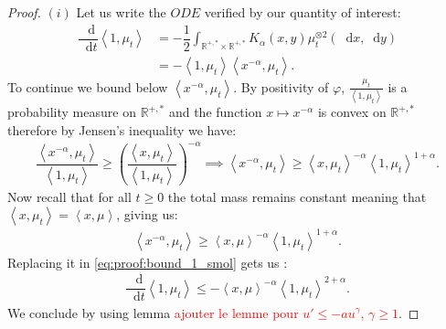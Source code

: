 \documentclass[11pt,a4paper]{article}
\newcommand{\RR}{\mathbb{R}}
\newcommand{\red}[1]{\textcolor{red}{#1}}
\newcommand{\dd}{\mathop{}\!\mathrm{d}}
\begin{document}
\begin{proof}
    $(i)$ Let us write the $ODE$ verified by our quantity of interest:
    \begin{align}
        \dfrac{\dd}{\dd t} \left\langle 1, \mu_t \right\rangle
        &= -\dfrac12\int_{\RR^{+,*} \times \RR^{+,*} } K_\alpha(x,y) \mu_t^{\otimes 2} (\dd x, \dd y) \nonumber\\
        &= -\left\langle 1, \mu_t \right\rangle \left\langle x^{-\alpha}, \mu_t \right\rangle. \label{eq:proof:bound_1_smol}
    \end{align}
    To continue we bound below $\left\langle x^{-\alpha}, \mu_t \right\rangle$. By positivity of $\varphi$, $\frac{\mu_t}{\left\langle 1, \mu_t\right\rangle}$ is a probability measure on $\RR^{+,*}$ and the function $x\mapsto x^{-\alpha}$ is convex on $\RR^{+,*}$ therefore by Jensen's inequality we have:
    \begin{align*}
        \dfrac{\left\langle x^{-\alpha},\mu_t \right\rangle}{\left\langle 1, \mu_t\right\rangle} \geq  \left(\dfrac{\left\langle x,\mu_t \right\rangle}{\left\langle 1, \mu_t\right\rangle}\right)^{-\alpha} \implies
        \left\langle x^{-\alpha},\mu_t \right\rangle \geq \left\langle x,\mu_t \right\rangle^{-\alpha} \left\langle 1, \mu_t\right\rangle^{1 + \alpha}.
    \end{align*}
    Now recall that for all $t \geq 0$ the total mass remains constant meaning that $\left\langle x,\mu_t\right\rangle = \left\langle x,\mu\right\rangle$, giving us:
    \begin{align*}
        \left\langle x^{-\alpha},\mu_t \right\rangle \geq \left\langle x,\mu \right\rangle^{-\alpha} \left\langle 1, \mu_t\right\rangle^{1 + \alpha}.
    \end{align*}
    Replacing it in \eqref{eq:proof:bound_1_smol} gets us :
    \begin{align*}
        \dfrac{\dd}{\dd t} \left\langle 1, \mu_t \right\rangle
        \leq -\left\langle x,\mu \right\rangle^{-\alpha}\left\langle 1, \mu_t \right\rangle^{2 + \alpha}.
    \end{align*}
    We conclude by using lemma \red{ajouter le lemme pour $u' \leq -a u^\gamma$, $\gamma \geq 1$}.


\end{proof}
\end{document}
